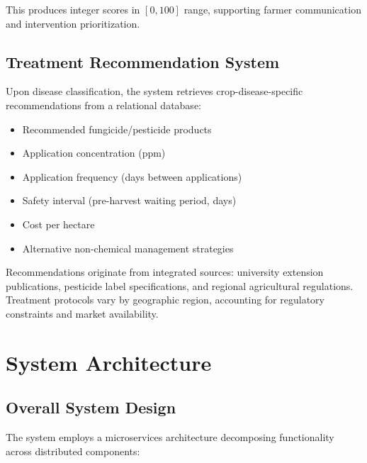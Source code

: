 \documentclass[conference]{IEEEtran}
\begin{document}
This produces integer scores in $[0, 100]$ range, supporting farmer communication and intervention prioritization.

\subsection{Treatment Recommendation System}

Upon disease classification, the system retrieves crop-disease-specific recommendations from a relational database:

\begin{itemize}
\item Recommended fungicide/pesticide products
\item Application concentration (ppm)
\item Application frequency (days between applications)
\item Safety interval (pre-harvest waiting period, days)
\item Cost per hectare
\item Alternative non-chemical management strategies
\end{itemize}

Recommendations originate from integrated sources: university extension publications, pesticide label specifications, and regional agricultural regulations. Treatment protocols vary by geographic region, accounting for regulatory constraints and market availability.

\section{System Architecture}
\label{sec:architecture}

\subsection{Overall System Design}

The system employs a microservices architecture decomposing functionality across distributed components:
\end{document}
